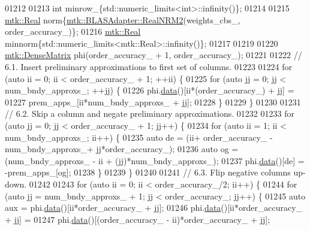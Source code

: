 \begin{DoxyCode}
{{01212 
01213     \textcolor{keywordtype}{int} minrow\_\{std::numeric\_limits<int>::infinity()\};
01214 
01215     \hyperlink{group__c01-roots_gac080bbbf5cbb5502c9f00405f894857d}{mtk::Real} norm\{\hyperlink{classmtk_1_1BLASAdapter_ab92440888b730863244c5d9479c11aca}{mtk::BLASAdapter::RealNRM2}(weights\_cbs\_,
      order\_accuracy\_)\};
01216     \hyperlink{group__c01-roots_gac080bbbf5cbb5502c9f00405f894857d}{mtk::Real} minnorm\{std::numeric\_limits<mtk::Real>::infinity()\};
01217 
01219 
01220     \hyperlink{classmtk_1_1DenseMatrix}{mtk::DenseMatrix} phi(order\_accuracy\_ + 1, order\_accuracy\_);
01221 
01222     \textcolor{comment}{// 6.1. Insert preliminary approximations to first set of columns.}
01223 
01224     \textcolor{keywordflow}{for} (\textcolor{keyword}{auto} ii = 0; ii < order\_accuracy\_ + 1; ++ii) \{
01225       \textcolor{keywordflow}{for} (\textcolor{keyword}{auto} jj = 0; jj < num\_bndy\_approxs\_; ++jj) \{
01226         phi.\hyperlink{classmtk_1_1DenseMatrix_a0c33b8a9e01d157c61ddbdf807c25d84}{data}()[ii*(order\_accuracy\_) + jj] =
01227           prem\_apps\_[ii*num\_bndy\_approxs\_ + jj];
01228       \}
01229     \}
01230 
01231     \textcolor{comment}{// 6.2. Skip a column and negate preliminary approximations.}
01232 
01233     \textcolor{keywordflow}{for} (\textcolor{keyword}{auto} jj = 0; jj < order\_accuracy\_ + 1; jj++) \{
01234       \textcolor{keywordflow}{for} (\textcolor{keyword}{auto} ii = 1; ii < num\_bndy\_approxs\_; ii++) \{
01235         \textcolor{keyword}{auto} de = (ii+ order\_accuracy\_ - num\_bndy\_approxs\_+ jj*order\_accuracy\_);
01236         \textcolor{keyword}{auto} og = (num\_bndy\_approxs\_ - ii + (jj)*num\_bndy\_approxs\_);
01237         phi.\hyperlink{classmtk_1_1DenseMatrix_a0c33b8a9e01d157c61ddbdf807c25d84}{data}()[de] = -prem\_apps\_[og];
01238       \}
01239     \}
01240 
01241     \textcolor{comment}{// 6.3. Flip negative columns up-down.}
01242 
01243     \textcolor{keywordflow}{for} (\textcolor{keyword}{auto} ii = 0; ii < order\_accuracy\_/2; ii++) \{
01244       \textcolor{keywordflow}{for} (\textcolor{keyword}{auto} jj = num\_bndy\_approxs\_ + 1; jj < order\_accuracy\_; jj++) \{
01245         \textcolor{keyword}{auto} aux = phi.\hyperlink{classmtk_1_1DenseMatrix_a0c33b8a9e01d157c61ddbdf807c25d84}{data}()[ii*order\_accuracy\_ + jj];
01246         phi.\hyperlink{classmtk_1_1DenseMatrix_a0c33b8a9e01d157c61ddbdf807c25d84}{data}()[ii*order\_accuracy\_ + jj] =
01247           phi.\hyperlink{classmtk_1_1DenseMatrix_a0c33b8a9e01d157c61ddbdf807c25d84}{data}()[(order\_accuracy\_ - ii)*order\_accuracy\_ + jj];
}}
\end{DoxyCode}
